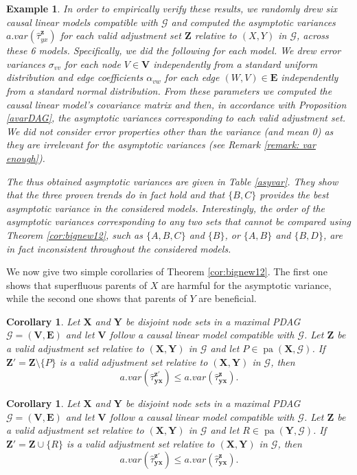 \documentclass[11pt,a4paper]{article}
\newtheorem{Corollary}[Satz]{Corollary}
\newtheorem{Example}[Satz]{Example}
\theoremstyle{definition}
\theoremstyle{remark}
\DeclareMathOperator{\pa}{pa}
\newcommand{\mpdag}{maximal PDAG}
\newcommand{\g}[1][G]{\mathcal{#1}}
\begin{document}
\begin{Example}
	
	In order to empirically verify these results, we randomly drew six causal linear models compatible with $\g$ and computed the asymptotic variances $a.var(\hat{\tau}^\mathbf{z}_{yx})$ for each valid adjustment set $\mathbf{Z}$ relative to $(X,Y)$ in $\g$, across these 6 models. Specifically, we did the following for each model. We drew error variances $\sigma_{vv}$ for each node $V \in \mathbf{V}$ independently from a standard uniform distribution and edge coefficients $\alpha_{vw}$ for each edge $(W,V) \in \mathbf{E}$ independently from a standard normal distribution. From these parameters we computed the causal linear model's covariance matrix and then, in accordance with Proposition \ref{avarDAG}, the asymptotic variances corresponding to each valid adjustment set. We did not consider error properties other than the variance (and mean 0) as they are irrelevant for the asymptotic variances (see Remark \ref{remark: var enough}).
	
	The thus obtained asymptotic variances are given in Table \ref{asyvar}. They show that the three proven trends do in fact hold and that $\{B,C\}$ provides the best asymptotic variance in the considered models. Interestingly, the order of the asymptotic variances corresponding to any two sets that cannot be compared using Theorem \ref{cor:bignew12}, such as $\{A,B,C\}$ and $\{B\}$, or $\{A,B\}$ and $\{B,D\}$, are in fact inconsistent throughout the considered models.
	\label{Apply-3.1}
	
	
\end{Example}

We now give two simple corollaries of Theorem \ref{cor:bignew12}. The first one shows that superfluous parents of $X$ are harmful for the asymptotic variance, while the second one shows that parents of $Y$ are beneficial.


\begin{Corollary}
	Let $\mathbf{X}$ and $\mathbf{Y}$ be disjoint node sets in a \mpdag{} $\g = (\mathbf{V},\mathbf{E})$ and let $\mathbf{V}$ follow a causal linear model compatible with $\g$. Let $\mathbf{Z}$ be a valid adjustment set relative to $(\mathbf{X},\mathbf{Y})$ in $\g$ and let $P \in \pa(\mathbf{X},\g)$. If $\mathbf{Z'} = \mathbf{Z} \setminus \{P\}$ is a valid adjustment set relative to $(\mathbf{X},\mathbf{Y})$ in $\g$, then 
	\[
	a.var(\hat{\tau}_{\mathbf{yx}}^{\mathbf{z'}}) \leq 
	a.var(\hat{\tau}_{\mathbf{yx}}^{\mathbf{z}}).
	\]
	\label{cor:badparents}
\end{Corollary}

\begin{Corollary}
	Let $\mathbf{X}$ and $\mathbf{Y}$ be disjoint node sets in a \mpdag{} $\g = (\mathbf{V},\mathbf{E})$ and let $\mathbf{V}$ follow a causal linear model compatible with $\g$. Let $\mathbf{Z}$ be a valid adjustment set relative to $(\mathbf{X},\mathbf{Y})$ in $\g$ and let $R \in 
	\pa(\mathbf{Y},\g)$. If $\mathbf{Z'} = \mathbf{Z} \cup \{R\}$ is a valid adjustment set relative to $(\mathbf{X},\mathbf{Y})$ in $\g$, then
	\[
	a.var(\hat{\tau}_{\mathbf{yx}}^{\mathbf{z'}}) \leq 
	a.var(\hat{\tau}_{\mathbf{yx}}^{\mathbf{z}}).
	\]
	\label{cor:goodparents}
\end{Corollary}
\end{document}
